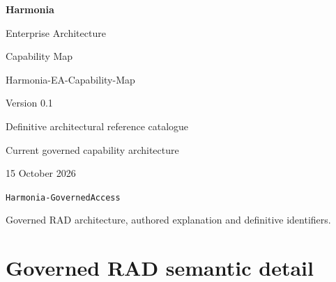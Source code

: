 \documentclass[10pt,a4paper,oneside,headings=small]{scrreprt}
\begin{document}
\hypersetup{pageanchor=false}
\begin{titlepage}
\vspace*{24mm}
{\Huge\bfseries\color{Ink} Harmonia\par}
\vspace{8mm}
{\LARGE Enterprise Architecture\par Capability Map\par}
\vspace{12mm}
{\Large Harmonia-EA-Capability-Map\par Version 0.1\par}
\vspace{12mm}
{\large Definitive architectural reference catalogue\par}
\vfill
Current governed capability architecture\par
15 October 2026\par
\texttt{Harmonia-GovernedAccess}\par
\vspace{8mm}
Governed RAD architecture, authored explanation and definitive identifiers.
\end{titlepage}
\hypersetup{pageanchor=true}
\tableofcontents
\clearpage
{}








\part{Governed RAD semantic detail}

\clearpage
{}
{}
\renewcommand{\indexname}{Index of architectural names}
\printindex
\end{document}
